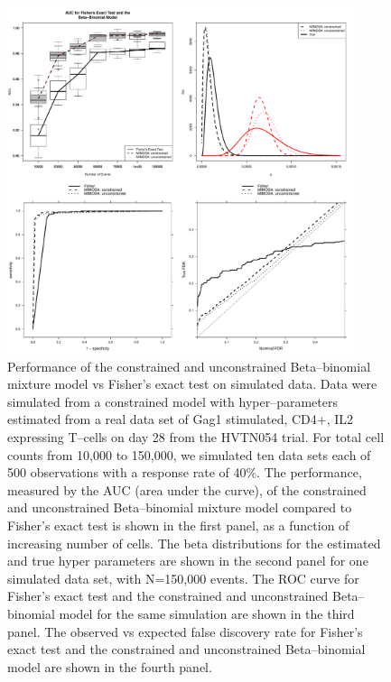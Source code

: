 \documentclass[11pt]{article}
\begin{document}
\begin{figure}[htbp] %
   \centering
   \includegraphics[width=4in]{Figures/simulations_all} 
   \caption{Performance of the constrained and unconstrained Beta--binomial mixture model vs Fisher's exact test on simulated data. Data were simulated from a constrained model with hyper--parameters estimated from a real data set of Gag1 stimulated, CD4+, IL2 expressing T--cells on day 28 from the HVTN054 trial. For total cell counts from 10,000 to 150,000, we simulated ten data sets each of 500 observations with a response rate of 40\%. The performance, measured by the AUC (area under the curve), of the constrained and unconstrained Beta--binomial mixture model compared to Fisher's exact test is shown in the first panel, as a function of increasing number of cells. The beta distributions for the estimated and true hyper parameters are shown in the second panel for one simulated data set, with N=150,000 events. The ROC curve for Fisher's exact test and the constrained and unconstrained Beta--binomial model for the same simulation are shown in the third panel. The observed vs expected false discovery rate for Fisher's exact test and the constrained and unconstrained Beta--binomial model are shown in the fourth panel.}
   \label{fig:simulations}
\end{figure}
\end{document}
